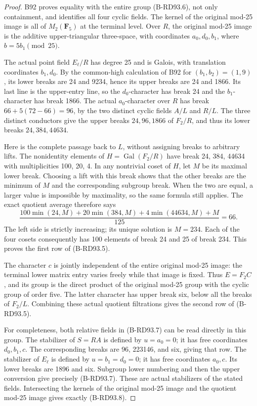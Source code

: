 \begin{proof}
B92 proves equality with the entire group (B-RD93.6), not only
containment, and identifies all four cyclic fields. The kernel
of the original mod-25 image is all of \(M_2(\mathbf F_5)\)
at the terminal level. Over \(R\), the original mod-25 image is
the additive upper-triangular three-space, with coordinates
\(a_0,d_0,b_1\), where \(b=5b_1\pmod {25}\).

The actual point field \(E_\ell/R\) has degree 25 and is
Galois, with translation coordinates \(b_1,d_0\). By the
common-high calculation of B92 for \((b_1,b_2)=(1,9)\), its
lower breaks are 24 and 9234, hence its upper breaks are
24 and 1866. Its last line is the upper-entry line, so the
\(d_0\)-character has break 24 and the \(b_1\)-character has
break 1866. The actual \(a_0\)-character over \(R\) has break
\(66+5(72-66)=96\), by the two distinct cyclic fields
\(A/L\) and \(R/L\). The three distinct conductors give the
upper breaks \(24,96,1866\) of \(F_2/R\), and thus its
lower breaks \(24,384,44634\).

Here is the complete passage back to \(L\), without assigning
breaks to arbitrary lifts. The nonidentity elements of
\(H=\operatorname{Gal}(F_2/R)\) have break 24, 384, 44634
with multiplicities 100, 20, 4. In any nontrivial coset of
\(H\), let \(M\) be its maximal lower break. Choosing a lift
with this break shows that the other breaks are the minimum
of \(M\) and the corresponding subgroup break. When the
two are equal, a larger value is impossible by maximality,
so the same formula still applies. The exact quotient average
therefore says
\[
 \frac{100\min(24,M)+20\min(384,M)+4\min(44634,M)+M}{125}
 =66.                                                 \tag{B-RD93.9}
\]
The left side is strictly increasing; its unique solution is
\(M=234\). Each of the four cosets consequently has 100
elements of break 24 and 25 of break 234. This proves the
first row of (B-RD93.5).

The character \(c\) is jointly independent of the entire
original mod-25 image: the terminal lower matrix entry varies
freely while that image is fixed. Thus
\(E=F_2C\), and its group is the direct product of the
original mod-25 group with the cyclic group of order five.
The latter character has upper break six, below all the
breaks of \(F_2/L\). Combining these actual quotient
filtrations gives the second row of (B-RD93.5).

For completeness, both relative fields in (B-RD93.7) can be
read directly in this group. The stabilizer of \(S=RA\)
is defined by \(u=a_0=0\); it has free coordinates
\(d_0,b_1,c\). The corresponding breaks are 96, 223146,
and six, giving that row. The stabilizer of \(E_\ell\)
is defined by \(u=b_1=d_0=0\); it has free coordinates
\(a_0,c\). Its lower breaks are 1896 and six. Subgroup
lower numbering and then the upper conversion give precisely
(B-RD93.7). These are actual stabilizers of the stated fields.
Intersecting the kernels of the original mod-25 image and
the quotient mod-25 image gives exactly (B-RD93.8).
\end{proof}

